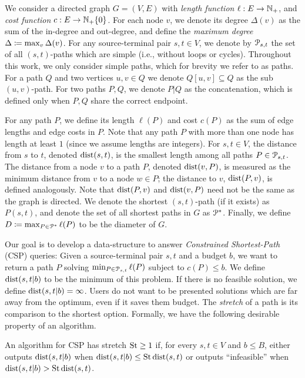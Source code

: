 We consider a directed graph $G=(V,E)$ with \emph{length function} $\ell:E\to \mathbb{N}_+$, and \emph{cost function} $c:E\to \mathbb{N}_+\{0\}$.
For each node $v$, we denote its degree $\Delta(v)$ as the sum of the in-degree and out-degree, and define the \emph{maximum degree} $\Delta \coloneqq \max_v\Delta(v)$.
For any source-terminal pair $s,t\in V$, we denote by $\mathcal{P}_{s,t}$ the set of all $(s,t)$-paths which are simple (i.e., without loops or cycles). 
Throughout this work, we only consider simple paths, which for brevity we refer to as paths.
For a path $Q$ and two vertices $u,v\in Q$ we denote $Q[u,v]\subseteq Q$ as the sub $(u,v)$-path.
For two paths $P,Q$, we denote $P|Q$ as the concatenation, which is defined only when $P,Q$ share the correct endpoint.

For any path $P$, we define its length $\ell(P)$ and cost $c(P)$ as the sum of edge lengths and edge costs in $P$. 
Note that any path $P$ with more than one node has length at least $1$ (since we assume lengths are integers).
For $s,t\in V$, the distance from $s$ to $t$, denoted $\mbox{dist}(s,t)$, is the smallest length among all paths $P\in\mathcal{P}_{s,t}$.
The distance from a node $v$ to a path $P$, denoted $\mbox{dist}(v,P)$, is measured as the minimum distance from $v$ to a node $w\in P$; the distance to $v$, $\mbox{dist}(P,v)$, is defined analogously.
Note that  $\mbox{dist}(P,v)$ and  $\mbox{dist}(v,P)$ need not be the same as the graph is directed.
We denote the shortest $(s,t)$-path (if it exists) as $P(s,t)$, and denote the set of all shortest paths in $G$ as $\mathcal{P}^*$.
Finally, we define $D\coloneqq\max_{P\in\mathcal{P}^*}\ell(P)$ to be the diameter of $G$.

Our goal is to develop a data-structure to answer \emph{Constrained Shortest-Path} (CSP) queries: 
Given a source-terminal pair $s,t$ and a budget $b$, we want to return a path $P$ solving
$\min_{P \in \mathcal{P}_{s,t}} \ell(P)$
subject to $c(P) \leq b$.
We define $\mbox{dist}(s,t|b)$ to be the minimum of this problem.
If there is no feasible solution, we define $\mbox{dist}(s,t|b)=\infty$.
Users do not want to be presented solutions which are far away from the optimum, even if it saves them budget.
The \emph{stretch} of a path is its comparison to the shortest option.
Formally, we have the following desirable property of an algorithm.

\begin{definition}[Stretch]
An algorithm for CSP has stretch $\operatorname{St}\geq 1$ if, for every $s,t\in V$ and $b\leq B$, either outputs $\mbox{dist}(s,t|b)$ when $\mbox{dist}(s,t|b)\leq \operatorname{St}\mbox{dist}(s,t)$ or outputs ``infeasible'' when $\mbox{dist}(s,t|b)>\operatorname{St}\mbox{dist}(s,t)$.
\end{definition}

